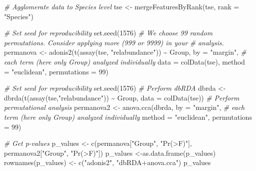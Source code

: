 \documentclass[
]{book}
\newenvironment{Shaded}{\begin{snugshade}}{\end{snugshade}}
\newcommand{\AttributeTok}[1]{\textcolor[rgb]{0.77,0.63,0.00}{#1}}
\newcommand{\CommentTok}[1]{\textcolor[rgb]{0.56,0.35,0.01}{\textit{#1}}}
\newcommand{\DecValTok}[1]{\textcolor[rgb]{0.00,0.00,0.81}{#1}}
\newcommand{\FunctionTok}[1]{\textcolor[rgb]{0.00,0.00,0.00}{#1}}
\newcommand{\NormalTok}[1]{#1}
\newcommand{\OtherTok}[1]{\textcolor[rgb]{0.56,0.35,0.01}{#1}}
\newcommand{\SpecialCharTok}[1]{\textcolor[rgb]{0.00,0.00,0.00}{#1}}
\newcommand{\StringTok}[1]{\textcolor[rgb]{0.31,0.60,0.02}{#1}}
\begin{document}
\begin{Shaded}
\begin{Highlighting}[]
\CommentTok{\# Agglomerate data to Species level}
\NormalTok{tse }\OtherTok{\textless{}{-}} \FunctionTok{mergeFeaturesByRank}\NormalTok{(tse,}
                         \AttributeTok{rank =} \StringTok{"Species"}\NormalTok{)}

\CommentTok{\# Set seed for reproducibility}
\FunctionTok{set.seed}\NormalTok{(}\DecValTok{1576}\NormalTok{)}
\CommentTok{\# We choose 99 random permutations. Consider applying more (999 or 9999) in your}
\CommentTok{\# analysis. }
\NormalTok{permanova }\OtherTok{\textless{}{-}} \FunctionTok{adonis2}\NormalTok{(}\FunctionTok{t}\NormalTok{(}\FunctionTok{assay}\NormalTok{(tse, }\StringTok{"relabundance"}\NormalTok{)) }\SpecialCharTok{\textasciitilde{}}\NormalTok{ Group,}
                     \AttributeTok{by =} \StringTok{"margin"}\NormalTok{, }\CommentTok{\# each term (here only \textquotesingle{}Group\textquotesingle{}) analyzed individually}
                     \AttributeTok{data =} \FunctionTok{colData}\NormalTok{(tse),}
                     \AttributeTok{method =} \StringTok{"euclidean"}\NormalTok{,}
                     \AttributeTok{permutations =} \DecValTok{99}\NormalTok{)}

\CommentTok{\# Set seed for reproducibility}
\FunctionTok{set.seed}\NormalTok{(}\DecValTok{1576}\NormalTok{)}
\CommentTok{\# Perform dbRDA}
\NormalTok{dbrda }\OtherTok{\textless{}{-}} \FunctionTok{dbrda}\NormalTok{(}\FunctionTok{t}\NormalTok{(}\FunctionTok{assay}\NormalTok{(tse,}\StringTok{"relabundance"}\NormalTok{)) }\SpecialCharTok{\textasciitilde{}}\NormalTok{ Group, }
               \AttributeTok{data =} \FunctionTok{colData}\NormalTok{(tse))}
\CommentTok{\# Perform permutational analysis}
\NormalTok{permanova2 }\OtherTok{\textless{}{-}} \FunctionTok{anova.cca}\NormalTok{(dbrda,}
                        \AttributeTok{by =} \StringTok{"margin"}\NormalTok{, }\CommentTok{\# each term (here only \textquotesingle{}Group\textquotesingle{}) analyzed individually}
                        \AttributeTok{method =} \StringTok{"euclidean"}\NormalTok{,}
                        \AttributeTok{permutations =} \DecValTok{99}\NormalTok{)}

\CommentTok{\# Get p{-}values}
\NormalTok{p\_values }\OtherTok{\textless{}{-}} \FunctionTok{c}\NormalTok{(permanova[}\StringTok{"Group"}\NormalTok{, }\StringTok{"Pr(\textgreater{}F)"}\NormalTok{], permanova2[}\StringTok{"Group"}\NormalTok{, }\StringTok{"Pr(\textgreater{}F)"}\NormalTok{])}
\NormalTok{p\_values }\OtherTok{\textless{}{-}}\FunctionTok{as.data.frame}\NormalTok{(p\_values)}
\FunctionTok{rownames}\NormalTok{(p\_values) }\OtherTok{\textless{}{-}} \FunctionTok{c}\NormalTok{(}\StringTok{"adonis2"}\NormalTok{, }\StringTok{"dbRDA+anova.cca"}\NormalTok{)}
\NormalTok{p\_values}
\end{Highlighting}
\end{Shaded}
\end{document}
